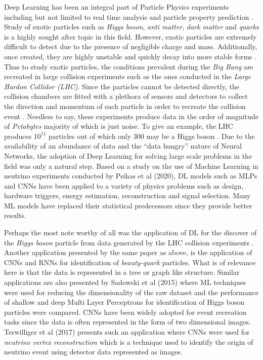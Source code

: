 Deep Learning has been an integral part of Particle Physics
experiments \cite{radovic2018machine, sadowski2015deep, de2019machine,
  psihas2020review, terwilliger2017vertex} including but not limited
to real time analysis and particle property prediction
\cite{radovic2018machine}. Study of exotic particles such as
\emph{Higgs boson}, \emph{anti matter}, \emph{dark matter} and
\emph{quarks} is a highly sought after topic in this field. However,
exotic particles are extremely difficult to detect due to the presence
of negligible charge and mass. Additionally, once created, they are
highly unstable and quickly decay into more stable forms
\cite{sadowski2015deep}. Thus to study exotic particles, the
conditions prevalent during the \emph{Big Bang} are recreated in large
collision experiments such as the ones conducted in the \emph{Large
Hardon Collidor (LHC)}. Since the particles cannot be detected
directly, the collision chambers are fitted with a plethora of sensors
and detectors to collect the direction and momentum of each particle
in order to recreate the collision event \cite{sadowski2015deep}.
Needless to say, these experiments produce data in the order of
magnitude of \emph{Petabytes} majority of which is just noise. To give
an example, the LHC produces $10^{11}$ particles out of which only 300
may be a Higgs boson \cite{sadowski2015deep}. Due to the availability
of an abundance of data and the ``data hungry'' nature of Neural
Networks, the adoption of Deep Learning for solving large scale
problems in the field was only a natural step. Based on a study on the
use of Machine Learning in neutrino experiments conducted by Psihas et
al (2020), DL models such as MLPs and CNNs have been applied to a
variety of physics problems such as design, hardware triggers, energy
estimation, reconstruction and signal selection. Many ML models have
replaced their statistical predecessors since they provide better
results.

Perhaps the most note worthy of all was the application of DL for the
discover of the \emph{Higgs boson} particle from data generated by the
LHC collision experiments \cite{radovic2018machine}. Another
application presented by the same paper as above, is the application
of CNNs and RNNs for identification of \emph{beauty-quark} particles.
What is of relevance here is that the data is represented in a tree or
graph like structure. Similar applications are also presented by
Sadowski et al (2015) where ML techniques were used for reducing the
dimensionality of the raw dataset and the performance of shallow and
deep Multi Layer Perceptrons for identification of Higgs boson
particles were compared. CNNs have been widely adopted for event
recreation tasks since the data is often represented in the form of
two dimensional images. Terwilliger et al (2017) presents such an
application where CNNs were used for \emph{neutrino vertex
reconstruction} which is a technique used to identify the origin of
neutrino event using detector data represented as images.

